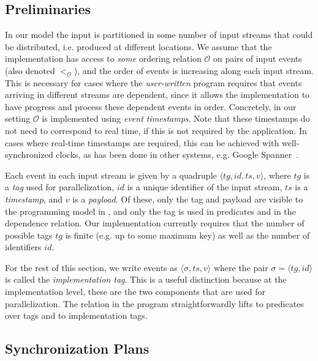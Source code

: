 \subsection{Preliminaries}
\label{dgs:ssec:distributed-assumptions}

In our model the input is partitioned in some number of input streams that could be distributed, i.e. produced at different locations.
We assume that the implementation has access to \emph{some} ordering
relation $\mathcal{O}$ on pairs of input events (also denoted
$<_{\mathcal{O}}$), and the order of events is increasing along each
input stream. This is necessary for cases where the
\emph{user-written} program requires that events arriving in
different streams are dependent, since it allows the implementation to
have progress and process these dependent events in order.
Concretely, in our setting $\mathcal{O}$ is implemented using \emph{event timestamps}.
Note that these timestamps do not need to correspond to real time, if this is not required by the application.
In cases where real-time timestamps are required, this can be achieved with well-synchronized clocks, as has been done in other systems, e.g. Google Spanner~\cite{corbett2013spanner}.

Each event in each input stream is given by a quadruple $\langle tg, id, ts, v \rangle$,
where $tg$ is a \emph{tag} used for parallelization, $id$ is a unique identifier of the input stream, $ts$ is a \emph{timestamp}, and $v$ is a \emph{payload}.
Of these, only the tag and payload are visible to the programming model
in , and only the tag is used in predicates and
in the dependence relation.
Our implementation currently requires that the number of possible tags $tg$ is finite (e.g. up to some maximum key) as well as the number of identifiers $id$.

For the rest of this section,
we write events as $\langle \sigma, ts, v \rangle$
where the pair $\sigma = \langle tg, id \rangle$ is called the \emph{implementation tag}.
This is a useful distinction because at the implementation level,
these are the two components that are used for parallelization.
The
relation  in the program straightforwardly lifts to predicates over tags and to implementation tags.

\subsection{Synchronization Plans}
\label{dgs:ssec:distributed-configurations}

